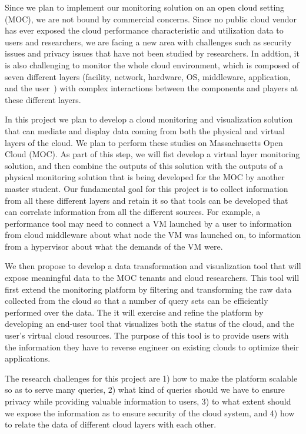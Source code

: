 Since we plan to implement our monitoring solution on an open cloud setting (MOC), we are not bound by commercial concerns. Since no public cloud vendor has ever exposed the cloud performance characteristic and utilization data to users and researchers, we are facing a new area with challenges such as security issues and privacy issues that have not been studied by researchers. In addtion, it is also challenging to monitor the whole cloud environment, which is composed of seven different layers (facility, network, hardware, OS, middleware, application, and the user~\cite{spring2011monitoring}) with complex interactions between the components and players at these different layers. 

In this project we plan to develop a cloud monitoring and visualization solution that can mediate and display data coming from both the physical and virtual layers of the cloud. We plan to perform these studies on Massachusetts Open Cloud (MOC). As part of this step, we will fist develop a virtual layer monitoring solution, and then combine the outputs of this solution with the outputs of a physical monitoring solution that is being developed for the MOC by another master student. Our fundamental goal for this project is to collect information from all these different layers and retain it so that tools can be developed that can correlate information from all the different sources. For example, a performance tool may need to connect a VM launched by a user to information from cloud middleware about what node the VM was launched on, to information from a hypervisor about what the demands of the VM were. 

We then propose to develop a data transformation and visualization tool that will expose meaningful data to the MOC tenants and cloud researchers. This tool will first extend the monitoring platform by filtering and transforming the raw data collected from the cloud so that a number of query sets can be efficiently performed over the data. The it will exercise and refine the platform by developing an end-user tool that visualizes both the status of the cloud, and the user’s virtual cloud resources. The purpose of this tool is to provide users with the information they have to reverse engineer on existing clouds to optimize their applications.

The research challenges for this project are 1) how to make the platform scalable so as to serve many queries, 2) what kind of queries should we have to ensure privacy while providing valuable information to users, 3) to what extent should we expose the information as to ensure security of the cloud system, and 4) how to relate the data of different cloud layers with each other. 

